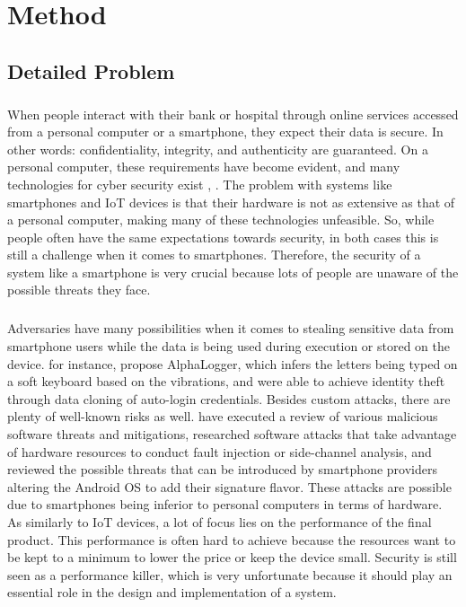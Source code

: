 \chapter{Method}

\section{Detailed Problem}

\paragraph*{}
When people interact with their bank or hospital through online services accessed from a personal computer or a smartphone, they expect their data is secure. In other words: confidentiality, integrity, and authenticity are guaranteed. On a personal computer, these requirements have become evident, and many technologies for cyber security exist \cite{RajasekharaiahK.M2020CSCa}, \cite{LakhdharYosra2021PSfS}. The problem with systems like smartphones and IoT devices is that their hardware is not as extensive as that of a personal computer, making many of these technologies unfeasible. So, while people often have the same expectations towards security, in both cases this is still a challenge when it comes to smartphones. Therefore, the security of a system like a smartphone is very crucial because lots of people are unaware of the possible threats they face.

\paragraph*{}
Adversaries have many possibilities when it comes to stealing sensitive data from smartphone users while the data is being used during execution or stored on the device. \cite{JavedAbdulRehman2020Adms} for instance, propose AlphaLogger, which infers the letters being typed on a soft keyboard based on the vibrations, and \cite{SongWenna2020ADAv} were able to achieve identity theft through data cloning of auto-login credentials. Besides custom attacks, there are plenty of well-known risks as well. \cite{SetyawanRico2020Abro} have executed a review of various malicious software threats and mitigations, \cite{GRAVELLIERJoseph2021RHAo} researched software attacks that take advantage of hardware resources to conduct fault injection or side-channel analysis, and \cite{KumarSudesh2020AoAS} reviewed the possible threats that can be introduced by smartphone providers altering the Android OS to add their signature flavor. These attacks are possible due to smartphones being inferior to personal computers in terms of hardware. As similarly to IoT devices, a lot of focus lies on the performance of the final product. This performance is often hard to achieve because the resources want to be kept to a minimum to lower the price or keep the device small. Security is still seen as a performance killer, which is very unfortunate because it should play an essential role in the design and implementation of a system. 

